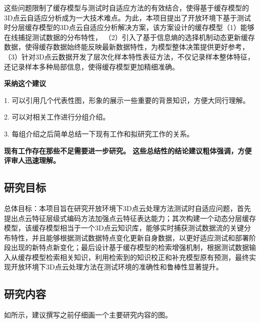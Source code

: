 \documentclass[12pt]{article}
\newcommand{\myEmph}[1]{\textbf{\textcolor[rgb]{0,0,0.25}{#1}}}
\begin{document}
这些问题限制了缓存模型与测试时自适应方法的有效结合，使得基于缓存模型的3D点云自适应分析成为一大技术难点。为此，本项目提出了开放环境下基于测试时分层缓存模型的3D点云自适应分析解决方案，该方案设计的缓存模型（1）能够在线捕捉测试数据的分布特性，
（2）引入了基于信息熵的选择机制动态更新缓存数据，使得缓存数据始终能反映最新数据特性，为模型整体决策提供更好参考，（3）针对3D点云数据开发了层次化样本特性表征方法，不仅记录样本整体特征，还记录样本多种局部信息，使得缓存模型更加精细准确。

\myEmph{采纳这个建议}

1. 可以引用几个代表性图，形象的展示一些重要的背景知识，方便大同行理解。

2. 可以对相关工作进行分组介绍。

3. 每组介绍之后简单总结一下现有工作和拟研究工作的关系。

\myEmph{现有工作存在那些不足需要进一步研究。
这些总结性的结论建议粗体强调，方便评审人迅速理解。}

{


}



\subsection{研究目标}
总体目标：本项目旨在研究开放环境下3D点云处理方法测试时自适应问题，首先提出点云特征层级式编码方法加强点云特征表达能力；其次构建一个动态分层缓存模型，该缓存模型相当于一个3D点云知识库，能够实时捕获测试数据流的关键分布特性，并且能够根据测试数据特点变化更新自身数据，以更好适应测试和部署阶段出现的新特点新变化；最后设计基于缓存模型的检索增强机制，根据测试数据输入从缓存模型检索相关知识，利用检索到的知识校正和补充模型原有预测，最终实现开放环境下3D点云处理方法在测试环境的准确性和鲁棒性显著提升。

\subsection{研究内容}


如所示，建议撰写之前仔细画一个主要研究内容的图。

\end{document}
